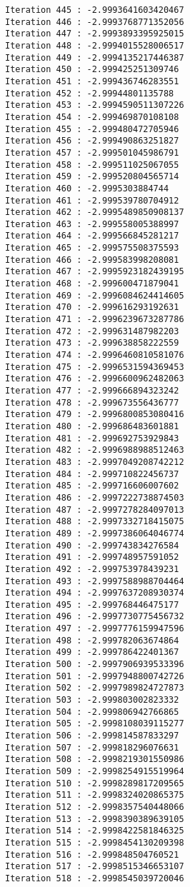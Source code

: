 \documentclass[11pt]{article}
\begin{document}
\begin{Verbatim}[commandchars=\\\{\}]
Iteration 445 : -2.9993641603420467
Iteration 446 : -2.9993768771352056
Iteration 447 : -2.9993893395925015
Iteration 448 : -2.9994015528006517
Iteration 449 : -2.9994135217446387
Iteration 450 : -2.999425251309746
Iteration 451 : -2.999436746283551
Iteration 452 : -2.99944801135788
Iteration 453 : -2.9994590511307226
Iteration 454 : -2.999469870108108
Iteration 455 : -2.999480472705946
Iteration 456 : -2.999490863251827
Iteration 457 : -2.999501045986791
Iteration 458 : -2.999511025067055
Iteration 459 : -2.999520804565714
Iteration 460 : -2.9995303884744
Iteration 461 : -2.999539780704912
Iteration 462 : -2.9995489850908137
Iteration 463 : -2.999558005388997
Iteration 464 : -2.999566845281217
Iteration 465 : -2.999575508375593
Iteration 466 : -2.999583998208081
Iteration 467 : -2.9995923182439195
Iteration 468 : -2.999600471879041
Iteration 469 : -2.9996084624414605
Iteration 470 : -2.999616293192631
Iteration 471 : -2.9996239673287786
Iteration 472 : -2.999631487982203
Iteration 473 : -2.999638858222559
Iteration 474 : -2.9996460810581076
Iteration 475 : -2.9996531594369453
Iteration 476 : -2.9996600962482063
Iteration 477 : -2.999666894323242
Iteration 478 : -2.999673556436777
Iteration 479 : -2.9996800853080416
Iteration 480 : -2.999686483601881
Iteration 481 : -2.999692753929843
Iteration 482 : -2.9996988988512463
Iteration 483 : -2.9997049208742212
Iteration 484 : -2.999710822456737
Iteration 485 : -2.999716606007602
Iteration 486 : -2.9997222738874503
Iteration 487 : -2.9997278284097013
Iteration 488 : -2.9997332718415075
Iteration 489 : -2.9997386064046774
Iteration 490 : -2.999743834276584
Iteration 491 : -2.999748957591052
Iteration 492 : -2.999753978439231
Iteration 493 : -2.9997588988704464
Iteration 494 : -2.9997637208930374
Iteration 495 : -2.999768446475177
Iteration 496 : -2.9997730775456732
Iteration 497 : -2.9997776159947596
Iteration 498 : -2.999782063674864
Iteration 499 : -2.999786422401367
Iteration 500 : -2.9997906939533396
Iteration 501 : -2.9997948800742726
Iteration 502 : -2.9997989824727873
Iteration 503 : -2.999803002823332
Iteration 504 : -2.999806942766865
Iteration 505 : -2.9998108039115277
Iteration 506 : -2.999814587833297
Iteration 507 : -2.999818296076631
Iteration 508 : -2.9998219301550986
Iteration 509 : -2.9998254915519964
Iteration 510 : -2.9998289817209565
Iteration 511 : -2.9998324020865375
Iteration 512 : -2.9998357540448066
Iteration 513 : -2.9998390389639105
Iteration 514 : -2.9998422581846325
Iteration 515 : -2.9998454130209398
Iteration 516 : -2.999848504760521
Iteration 517 : -2.9998515346653107
Iteration 518 : -2.9998545039720046

\end{Verbatim}
\end{document}
